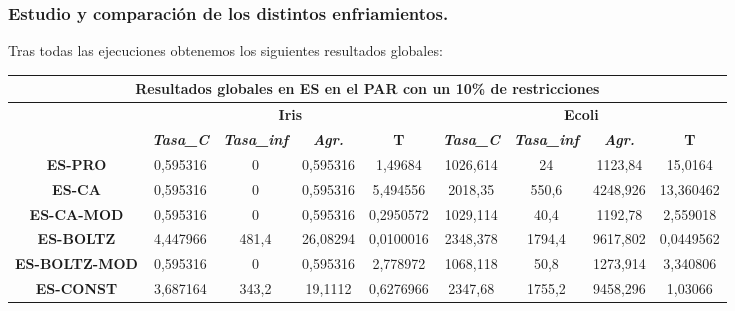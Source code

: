 \documentclass[12pt, spanish]{article}
\begin{document}
\subsubsection{Estudio y comparación de los distintos enfriamientos.}

Tras todas las ejecuciones obtenemos los siguientes resultados globales:

\begin{table}[H]
\hspace*{-1.2cm}\begin{tabular}{|c|c|c|c|c|c|c|c|c|}
\hline
\multicolumn{9}{|c|}{\textbf{Resultados globales en ES en el PAR con un 10\% de restricciones}}                                                                                                                                         \\ \hline
\multicolumn{1}{|l|}{\multirow{2}{*}{}} & \multicolumn{4}{c|}{\textbf{Iris}}                                                            & \multicolumn{4}{c|}{\textbf{Ecoli}}                                                           \\ \cline{2-9} 
\multicolumn{1}{|l|}{}                  & \textit{\textbf{Tasa\_C}} & \textit{\textbf{Tasa\_inf}} & \textit{\textbf{Agr.}} & \textbf{T} & \textit{\textbf{Tasa\_C}} & \textit{\textbf{Tasa\_inf}} & \textit{\textbf{Agr.}} & \textbf{T} \\ \hline
\textbf{ES-PRO}                         & 0,595316                  & 0                           & 0,595316               & 1,49684    & 1026,614                  & 24                          & 1123,84                & 15,0164    \\ \hline
\textbf{ES-CA}                          & 0,595316                  & 0                           & 0,595316               & 5,494556   & 2018,35                   & 550,6                       & 4248,926               & 13,360462  \\ \hline
\textbf{ES-CA-MOD}                      & 0,595316                  & 0                           & 0,595316               & 0,2950572  & 1029,114                  & 40,4                        & 1192,78                & 2,559018   \\ \hline
\textbf{ES-BOLTZ}                       & 4,447966                  & 481,4                       & 26,08294               & 0,0100016  & 2348,378                  & 1794,4                      & 9617,802               & 0,0449562  \\ \hline
\textbf{ES-BOLTZ-MOD}                   & 0,595316                  & 0                           & 0,595316               & 2,778972   & 1068,118                  & 50,8                        & 1273,914               & 3,340806   \\ \hline
\textbf{ES-CONST}                       & 3,687164                  & 343,2                       & 19,1112                & 0,6276966  & 2347,68                   & 1755,2                      & 9458,296               & 1,03066    \\ \hline
\end{tabular}
\end{table}
\end{document}
